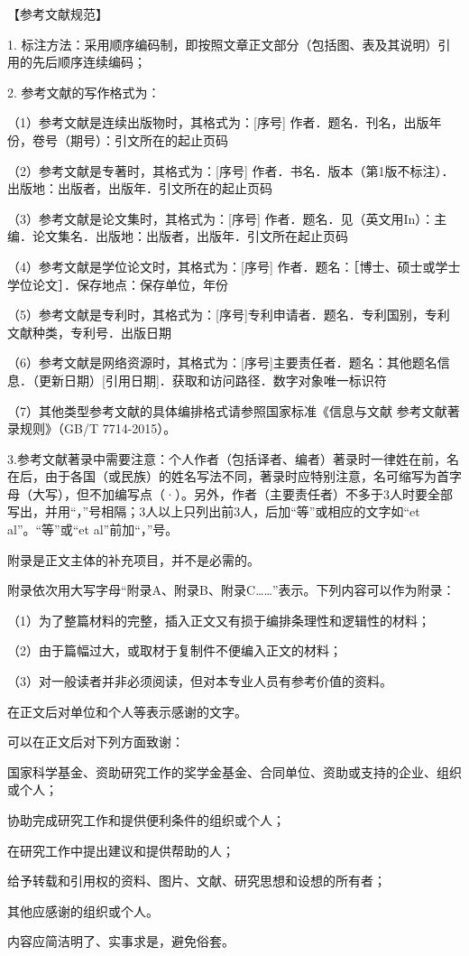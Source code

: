 \documentclass[fontset=auto]{jnuthesis}
\begin{document}
【参考文献规范】

\vspace{\baselineskip}

1. 标注方法：采用顺序编码制，即按照文章正文部分（包括图、表及其说明）引用的先后顺序连续编码；

2. 参考文献的写作格式为：

（1）参考文献是连续出版物时，其格式为：[序号] 作者．题名．刊名，出版年份，卷号（期号）：引文所在的起止页码

（2）参考文献是专著时，其格式为：[序号] 作者．书名．版本（第1版不标注）．出版地：出版者，出版年．引文所在的起止页码

（3）参考文献是论文集时，其格式为：[序号] 作者．题名．见（英文用In）：主编．论文集名．出版地：出版者，出版年．引文所在起止页码

（4）参考文献是学位论文时，其格式为：[序号] 作者．题名：［博士、硕士或学士学位论文］．保存地点：保存单位，年份

（5）参考文献是专利时，其格式为：[序号]专利申请者．题名．专利国别，专利文献种类，专利号．出版日期

（6）参考文献是网络资源时，其格式为：[序号]主要责任者．题名：其他题名信息．（更新日期）[引用日期]．获取和访问路径．数字对象唯一标识符

（7）其他类型参考文献的具体编排格式请参照国家标准《信息与文献 参考文献著录规则》（GB/T 7714-2015）。

3.参考文献著录中需要注意：个人作者（包括译者、编者）著录时一律姓在前，名在后，由于各国（或民族）的姓名写法不同，著录时应特别注意，名可缩写为首字母（大写），但不加编写点（·）。另外，作者（主要责任者）不多于3人时要全部写出，并用“，”号相隔；3人以上只列出前3人，后加“等”或相应的文字如“et al”。“等”或“et al”前加“，”号。



附录是正文主体的补充项目，并不是必需的。

附录依次用大写字母“附录A、附录B、附录C……”表示。下列内容可以作为附录：

（1）为了整篇材料的完整，插入正文又有损于编排条理性和逻辑性的材料；

（2）由于篇幅过大，或取材于复制件不便编入正文的材料；

（3）对一般读者并非必须阅读，但对本专业人员有参考价值的资料。


在正文后对单位和个人等表示感谢的文字。

\vspace{\baselineskip}

可以在正文后对下列方面致谢：

国家科学基金、资助研究工作的奖学金基金、合同单位、资助或支持的企业、组织或个人；

协助完成研究工作和提供便利条件的组织或个人；

在研究工作中提出建议和提供帮助的人；

给予转载和引用权的资料、图片、文献、研究思想和设想的所有者；

其他应感谢的组织或个人。

内容应简洁明了、实事求是，避免俗套。
\end{document}
